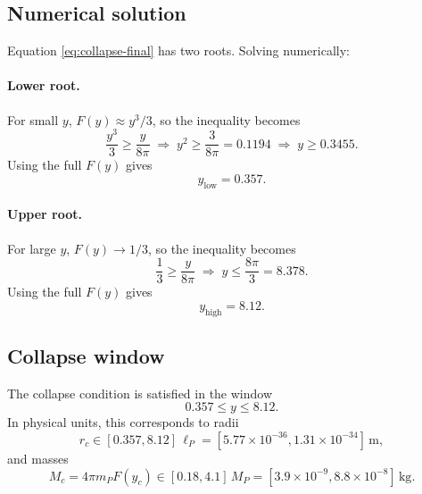 \documentclass[a4paper,1pt,oneside,openany]{book}
\begin{document}
\subsection{Numerical solution}

Equation \eqref{eq:collapse-final} has two roots. Solving 
numerically:

\paragraph{Lower root.}
For small $y$, $F(y)\approx y^{3}/3$, so the inequality becomes
\begin{equation}
\frac{y^{3}}{3}\ge\frac{y}{8\pi}
\;\Longrightarrow\;
y^{2}\ge\frac{3}{8\pi}=0.1194
\;\Longrightarrow\;
y\ge0.3455.
\label{eq:lower-approx}
\end{equation}
Using the full $F(y)$ gives
\begin{equation}
y_{\text{low}}=0.357.
\label{eq:ylow}
\end{equation}

\paragraph{Upper root.}
For large $y$, $F(y)\to 1/3$, so the inequality becomes
\begin{equation}
\frac{1}{3}\ge\frac{y}{8\pi}
\;\Longrightarrow\;
y\le\frac{8\pi}{3}=8.378.
\label{eq:upper-approx}
\end{equation}
Using the full $F(y)$ gives
\begin{equation}
y_{\text{high}}=8.12.
\label{eq:yhigh}
\end{equation}

\subsection{Collapse window}

The collapse condition is satisfied in the window
\begin{equation}
\boxed{\;0.357\le y\le 8.12.\;}
\label{eq:window}
\end{equation}
In physical units, this corresponds to radii
\begin{equation}
r_{c}\in[0.357,8.12]\,\ell_{P}
=
[5.77\times 10^{-36},1.31\times 10^{-34}]\,\text{m},
\label{eq:rc-window}
\end{equation}
and masses
\begin{equation}
M_{c}=4\pi m_{P}F(y_{c})
\in
[0.18,4.1]\,M_{P}
=
[3.9\times 10^{-9},8.8\times 10^{-8}]\,\text{kg}.
\label{eq:Mc-window}
\end{equation}
\end{document}
